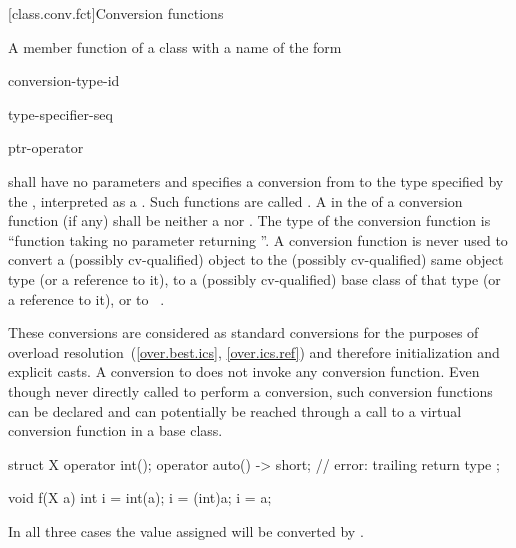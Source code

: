 [class.conv.fct]{Conversion functions}%
%
%
%

\pnum
A member function of a class  with a name of the form
\begin{bnf}
\br
     conversion-type-id
\end{bnf}

\begin{bnf}
\br
    type-specifier-seq 
\end{bnf}

\begin{bnf}
\br
    ptr-operator 
\end{bnf}
shall have no parameters and
specifies a conversion from  to
the type specified by the ,
interpreted as a .
Such functions are called .
A  in the 
of a conversion function (if any) shall be neither
a  nor .
%
The type of the conversion function is
``function taking no parameter returning
''.
A conversion function is never used to convert a (possibly cv-qualified) object
to the (possibly cv-qualified) same object type (or a reference to it),
to a (possibly cv-qualified) base class of that type (or a reference to it),
or to \cv{}~.
\begin{footnote}
These conversions are considered
as standard conversions for the purposes of overload resolution~(\ref{over.best.ics}, \ref{over.ics.ref}) and therefore initialization and explicit casts. A conversion to  does not invoke any conversion function.
Even though never directly called to perform a conversion,
such conversion functions can be declared and can potentially
be reached through a call to a virtual conversion function in a base class.
\end{footnote}
\begin{example}
\begin{codeblock}
struct X {
  operator int();
  operator auto() -> short;     // error: trailing return type
};

void f(X a) {
  int i = int(a);
  i = (int)a;
  i = a;
}
\end{codeblock}
In all three cases the value assigned will be converted by
.
\end{example}


